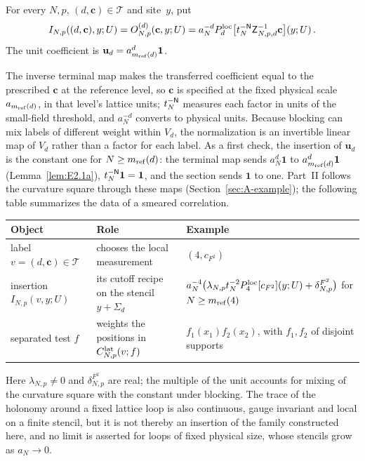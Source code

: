 \begin{definition}\label{def:D08}
For every $N,p$, $(d,\mathbf c)\in\mathcal T$ and site~$y$, put
\begin{equation*}
I_{N,p}((d,\mathbf c),y;U)=O^{(d)}_{N,p}(\mathbf c,y;U)
=a_N^{-d}P_{d}^{\mathrm{loc}}\bigl[t_N^{-\mathsf{N}}\mathsf Z_{N,p,d}^{-1}\mathbf c\bigr](y;U)\,.
\end{equation*}
The unit coefficient is $\mathbf u_d=a_{m_{\mathrm{ref}}(d)}^d\mathbf1$.
\end{definition}

The inverse terminal map makes the transferred coefficient equal to the prescribed $\mathbf c$ at the reference level, so $\mathbf c$ is specified at the fixed physical scale $a_{m_{\mathrm{ref}}(d)}$, in that level's lattice units; $t_N^{-\mathsf{N}}$ measures each factor in units of the small-field threshold, and $a_N^{-d}$ converts to physical units. Because blocking can mix labels of different weight within $V_d$, the normalization is an invertible linear map of $V_d$ rather than a factor for each label. As a first check, the insertion of $\mathbf u_d$ is the constant one for $N\ge m_{\mathrm{ref}}(d)$: the terminal map sends $a_N^d\mathbf1$ to $a_{m_{\mathrm{ref}}(d)}^d\mathbf1$ (Lemma~\ref{lem:E2.1a}), $t_N^{-\mathsf{N}}\mathbf1=\mathbf1$, and the section sends $\mathbf1$ to one. Part~II follows the curvature square through these maps (Section~\ref{sec:A-example}); the following table summarizes the data of a smeared correlation.
\begin{center}\small
\begin{tabular}{@{}p{}p{}p{}@{}}
\toprule
\raggedright Object & \raggedright Role & \raggedright Example\tabularnewline
\midrule
\raggedright label $v=(d,\mathbf c)\in\mathcal T$ & \raggedright chooses the local measurement & \raggedright $(4,c_{F^2})$\tabularnewline
\raggedright insertion $I_{N,p}(v,y;U)$ & \raggedright its cutoff recipe on the stencil $y+\Sigma_d$ & \raggedright $a_N^{-4}\bigl(\lambda_{N,p}t_N^{-2}P_{4}^{\mathrm{loc}}[c_{F^2}](y;U)+\delta^{F^2}_{N,p}\bigr)$ for $N\ge m_{\mathrm{ref}}(4)$\tabularnewline
\raggedright separated test $f$ & \raggedright weights the positions in $C^{\mathrm{lat}}_{N,p}(v;f)$ & \raggedright $f_1(x_1)f_2(x_2)$, with $f_1,f_2$ of disjoint supports\tabularnewline
\bottomrule
\end{tabular}
\end{center}
Here $\lambda_{N,p}\ne0$ and $\delta^{F^2}_{N,p}$ are real; the multiple of the unit accounts for mixing of the curvature square with the constant under blocking. The trace of the holonomy around a fixed lattice loop is also continuous, gauge invariant and local on a finite stencil, but it is not thereby an insertion of the family constructed here, and no limit is asserted for loops of fixed physical size, whose stencils grow as $a_N\to0$.

